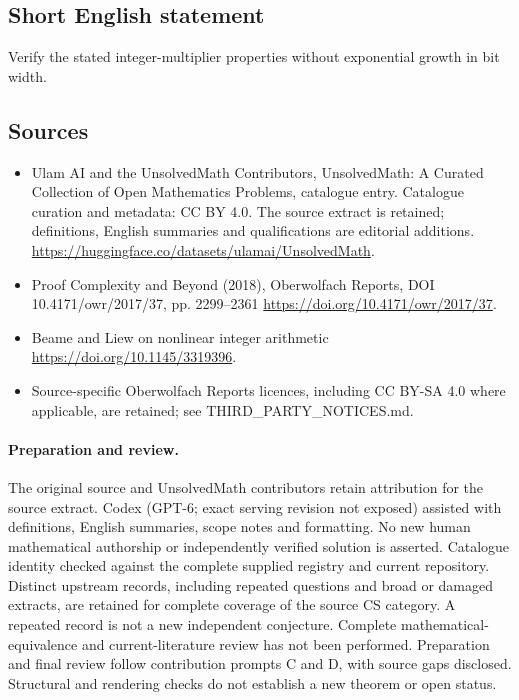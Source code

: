 \documentclass[11pt]{article}
\begin{document}
\subsection{Short English statement}
Verify the stated integer-multiplier properties without exponential growth in bit width.
\subsection{Sources}
\begin{itemize}
\item[\hypertarget{source:statement:1}{S1}] Ulam AI and the UnsolvedMath Contributors, UnsolvedMath: A Curated Collection of Open Mathematics Problems, catalogue entry. Catalogue curation and metadata: CC BY 4.0. The source extract is retained; definitions, English summaries and qualifications are editorial additions.
\url{https://huggingface.co/datasets/ulamai/UnsolvedMath}.
\item[\hypertarget{source:statement:2}{S2}] Proof Complexity and Beyond (2018), Oberwolfach Reports, DOI 10.4171/owr/2017/37, pp. 2299--2361
\url{https://doi.org/10.4171/owr/2017/37}.
\item[\hypertarget{source:statement:3}{S3}] Beame and Liew on nonlinear integer arithmetic
\url{https://doi.org/10.1145/3319396}.
\item Source-specific Oberwolfach Reports licences, including CC BY-SA 4.0 where applicable, are retained; see THIRD\_PARTY\_NOTICES.md.
\end{itemize}
\paragraph{Preparation and review.}
The original source and UnsolvedMath contributors retain attribution for the source extract. Codex (GPT-6; exact serving revision not exposed) assisted with definitions, English summaries, scope notes and formatting. No new human mathematical authorship or independently verified solution is asserted. Catalogue identity checked against the complete supplied registry and current repository. Distinct upstream records, including repeated questions and broad or damaged extracts, are retained for complete coverage of the source CS category. A repeated record is not a new independent conjecture. Complete mathematical-equivalence and current-literature review has not been performed. Preparation and final review follow contribution prompts C and D, with source gaps disclosed. Structural and rendering checks do not establish a new theorem or open status.
\label{end:statement}
\end{document}
